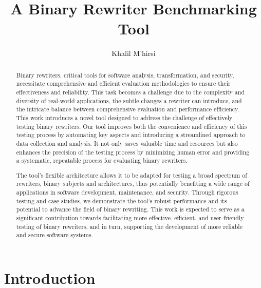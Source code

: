 \documentclass[a4paper,11pt,oneside]{report}
\title{A Binary Rewriter Benchmarking Tool}
\author{Khalil M'hirsi}
\begin{document}
\maketitle

\begin{abstract}
    \setlength{\parindent}{4em}
    
    Binary rewriters, critical tools for software analysis, transformation, and security,
    necessitate comprehensive and efficient evaluation methodologies to ensure their
    effectiveness and reliability. This task becomes a challenge due to the complexity and
    diversity of real-world applications, the subtle changes a rewriter can introduce, and the
    intricate balance between comprehensive evaluation and performance efficiency. This work
    introduces a novel tool designed to address the challenge of effectively testing binary
    rewriters. Our tool improves both the convenience and efficiency of this testing process by
    automating key aspects and introducing a streamlined approach to data collection and
    analysis. It not only saves valuable time and resources but also enhances the precision of the
    testing process by minimizing human error and providing a systematic, repeatable process
    for evaluating binary rewriters.

    The tool's flexible architecture allows it to be adapted for testing a broad spectrum of
    rewriters, binary subjects and architectures, thus potentially benefiting a wide range of
    applications in software development, maintenance, and security. Through rigorous testing
    and case studies, we demonstrate the tool's robust performance and its potential to
    advance the field of binary rewriting. This work is expected to serve as a significant
    contribution towards facilitating more effective, efficient, and user-friendly testing of binary
    rewriters, and in turn, supporting the development of more reliable and secure software
    systems.
\end{abstract}

\maketoc

\chapter{Introduction}
\end{document}
